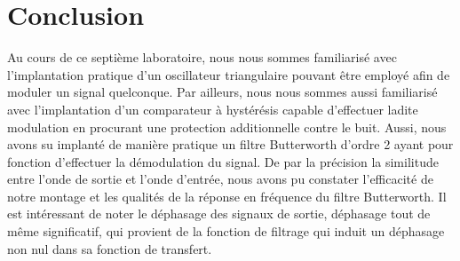 

\chapter{Conclusion}
\label{s:conclusion}

Au cours de ce septième laboratoire, nous nous sommes familiarisé avec l'implantation pratique d'un oscillateur triangulaire pouvant être employé afin de moduler un signal quelconque. Par ailleurs, nous nous sommes aussi familiarisé avec l'implantation d'un comparateur à hystérésis capable d'effectuer ladite modulation en procurant une protection additionnelle contre le buit. Aussi, nous avons su implanté de manière pratique un filtre Butterworth d'ordre 2 ayant pour fonction d'effectuer la démodulation du signal. De par la précision la similitude entre l'onde de sortie et l'onde d'entrée, nous avons pu constater l'efficacité de notre montage et les qualités de la réponse en fréquence du filtre Butterworth. Il est intéressant de noter le déphasage des signaux de sortie, déphasage tout de même significatif, qui provient de la fonction de filtrage qui induit un déphasage non nul dans sa fonction de transfert.